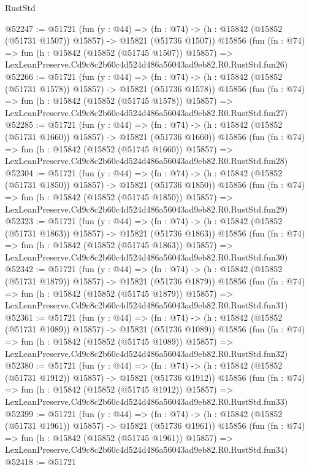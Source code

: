 \begin{lexlean}{RustStd}
\begin{coremodule}
@52247 := @51721
    (fun (y : @44) =>
    (fn : @74) -> (h : @15842 (@15852 (@51731 @1507)) @15857) -> @15821 (@51736 @1507))
    @15856
    (fun (fn : @74) =>
    fun (h : @15842 (@15852 (@51745 @1507)) @15857) =>
    LexLeanPreserve.Cd9c8c2b60c4d524d486a56043ad9eb82.R0.RustStd.fun26)
@52266 := @51721
    (fun (y : @44) =>
    (fn : @74) -> (h : @15842 (@15852 (@51731 @1578)) @15857) -> @15821 (@51736 @1578))
    @15856
    (fun (fn : @74) =>
    fun (h : @15842 (@15852 (@51745 @1578)) @15857) =>
    LexLeanPreserve.Cd9c8c2b60c4d524d486a56043ad9eb82.R0.RustStd.fun27)
@52285 := @51721
    (fun (y : @44) =>
    (fn : @74) -> (h : @15842 (@15852 (@51731 @1660)) @15857) -> @15821 (@51736 @1660))
    @15856
    (fun (fn : @74) =>
    fun (h : @15842 (@15852 (@51745 @1660)) @15857) =>
    LexLeanPreserve.Cd9c8c2b60c4d524d486a56043ad9eb82.R0.RustStd.fun28)
@52304 := @51721
    (fun (y : @44) =>
    (fn : @74) -> (h : @15842 (@15852 (@51731 @1850)) @15857) -> @15821 (@51736 @1850))
    @15856
    (fun (fn : @74) =>
    fun (h : @15842 (@15852 (@51745 @1850)) @15857) =>
    LexLeanPreserve.Cd9c8c2b60c4d524d486a56043ad9eb82.R0.RustStd.fun29)
@52323 := @51721
    (fun (y : @44) =>
    (fn : @74) -> (h : @15842 (@15852 (@51731 @1863)) @15857) -> @15821 (@51736 @1863))
    @15856
    (fun (fn : @74) =>
    fun (h : @15842 (@15852 (@51745 @1863)) @15857) =>
    LexLeanPreserve.Cd9c8c2b60c4d524d486a56043ad9eb82.R0.RustStd.fun30)
@52342 := @51721
    (fun (y : @44) =>
    (fn : @74) -> (h : @15842 (@15852 (@51731 @1879)) @15857) -> @15821 (@51736 @1879))
    @15856
    (fun (fn : @74) =>
    fun (h : @15842 (@15852 (@51745 @1879)) @15857) =>
    LexLeanPreserve.Cd9c8c2b60c4d524d486a56043ad9eb82.R0.RustStd.fun31)
@52361 := @51721
    (fun (y : @44) =>
    (fn : @74) -> (h : @15842 (@15852 (@51731 @1089)) @15857) -> @15821 (@51736 @1089))
    @15856
    (fun (fn : @74) =>
    fun (h : @15842 (@15852 (@51745 @1089)) @15857) =>
    LexLeanPreserve.Cd9c8c2b60c4d524d486a56043ad9eb82.R0.RustStd.fun32)
@52380 := @51721
    (fun (y : @44) =>
    (fn : @74) -> (h : @15842 (@15852 (@51731 @1912)) @15857) -> @15821 (@51736 @1912))
    @15856
    (fun (fn : @74) =>
    fun (h : @15842 (@15852 (@51745 @1912)) @15857) =>
    LexLeanPreserve.Cd9c8c2b60c4d524d486a56043ad9eb82.R0.RustStd.fun33)
@52399 := @51721
    (fun (y : @44) =>
    (fn : @74) -> (h : @15842 (@15852 (@51731 @1961)) @15857) -> @15821 (@51736 @1961))
    @15856
    (fun (fn : @74) =>
    fun (h : @15842 (@15852 (@51745 @1961)) @15857) =>
    LexLeanPreserve.Cd9c8c2b60c4d524d486a56043ad9eb82.R0.RustStd.fun34)
@52418 := @51721

\end{coremodule}
\end{lexlean}

